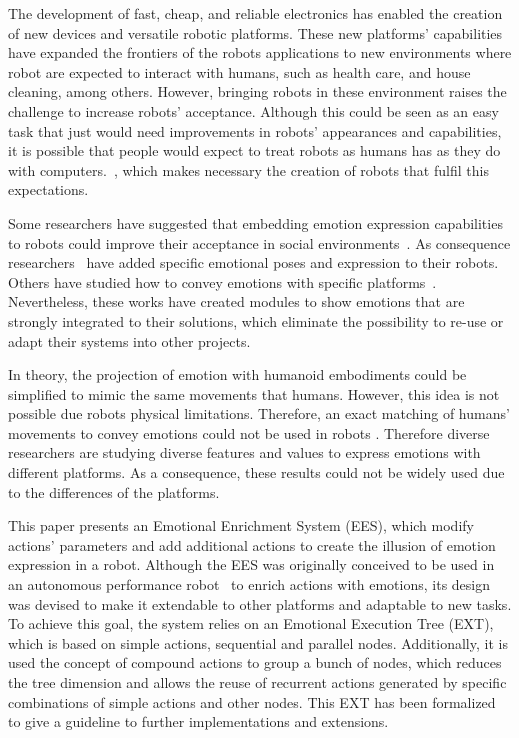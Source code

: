 The development of fast, cheap, and reliable electronics has enabled the creation of new devices and versatile robotic platforms. These new platforms' capabilities have expanded the frontiers of the robots applications  to new environments where robot are expected to interact with humans, such as health care, and house cleaning, among others. However, bringing robots in these environment raises the challenge to increase robots' acceptance. Although this could be seen as an easy task that just would need improvements in robots' appearances and capabilities, it is possible that people would expect to treat robots as humans has  as they do with computers.~\cite{Reeves1996}, which makes necessary the creation of robots that fulfil this expectations.

Some researchers have suggested that embedding emotion expression capabilities to robots could improve their acceptance in social environments~\cite{Pavia2014}. As consequence researchers~\cite{Breazeal2002,Arras2012} have added specific emotional poses and expression to their robots. Others have studied how to convey emotions with specific platforms~\cite{Li2011,Brown2014}. Nevertheless, these works have created modules to show emotions that are strongly integrated to their solutions, which eliminate the possibility to re-use or adapt their systems into other projects.

In theory, the projection of emotion with humanoid embodiments could be simplified to mimic the same movements that humans. However, this idea is not possible due robots physical limitations. Therefore, an exact matching of humans’ movements to convey emotions could not be used in robots \cite{Saerbeck2007,Canamero2010}. Therefore diverse researchers are studying diverse features and values to express emotions with different platforms. As a consequence, these results could not be widely used due to the differences of the platforms.

This paper presents an Emotional Enrichment System (EES), which modify actions' parameters and add additional actions to create the illusion of emotion expression in a robot. Although the EES was originally conceived to be used in an autonomous performance robot~\cite{angel2013} to enrich actions with emotions, its design was devised to make it extendable to other platforms and adaptable to new tasks. To achieve this goal, the system relies on an Emotional Execution Tree (EXT), which is based on simple actions, sequential and parallel nodes. Additionally, it is used the concept of compound actions to group a bunch of nodes, which reduces the tree dimension and allows the reuse of recurrent actions  generated by specific combinations of simple actions and other nodes. This EXT has been formalized to give a guideline to further implementations and extensions.
 
